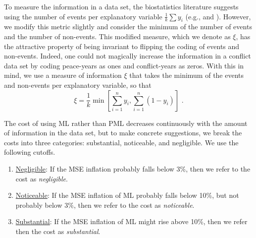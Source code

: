 \documentclass[12pt]{article}
\begin{document}
To measure the information in a data set, the biostatistics literature suggests using the number of events per explanatory variable $\frac{1}{k}\sum y_i$ (e.g., \citealt{Peduzzietal1996} and \citealt{VittinghoffMcCulloch2007}).
However, we modify this metric slightly and consider the minimum of the number of events and the number of non-events. 
This modified measure, which we denote as $\xi$, has the attractive property of being invariant to flipping the coding of events and non-events. 
Indeed, one could not magically increase the information in a conflict data set by coding peace-years as ones and conflict-years as zeros.
With this in mind, we use a measure of information $\xi$ that takes the minimum of the events and non-events per explanatory variable, so that
\begin{equation}
\xi = \frac{1}{k}\min \left[ \sum_{i = 1}^n y_i, \sum_{i = 1}^n(1 - y_i) \right]\text{ .}
\end{equation}

The cost of using ML rather than PML decreases continuously with the amount of information in the data set, but to make concrete suggestions, we break the costs into three categories: substantial, noticeable, and negligible.
We use the following cutoffs.
\begin{enumerate}
\item \underline{Negligible}: If the MSE inflation probably falls below 3\%, then we refer to the cost as \textit{negligible}.
\item \underline{Noticeable}: If the MSE inflation of ML probably falls below 10\%, but not probably below 3\%, then we refer to the cost as \textit{noticeable}.
\item \underline{Substantial}: If the MSE inflation of ML might rise above 10\%, then we refer then the cost as \textit{substantial}.
\end{enumerate}
\end{document}
